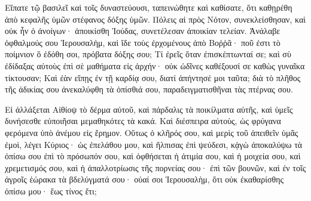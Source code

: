 {\par }{\PP {}Εἴπατε τῷ βασιλεῖ καὶ τοῖς δυναστεύουσι, ταπεινώθητε καὶ καθίσατε, ὅτι καθῃρέθη ἀπὸ κεφαλῆς ὑμῶν στέφανος δόξης ὑμῶν.
Πόλεις αἱ πρὸς Νότον, συνεκλείσθησαν, καὶ οὐκ ἦν ὁ ἀνοίγων· ἀποικίσθη Ἰούδας, συνετέλεσαν ἀποικίαν τελείαν.
Ἀνάλαβε ὀφθαλμούς σου Ἱερουσαλὴμ, καὶ ἴδε τοὺς ἐρχομένους ἀπὸ Βοῤῥᾶ· ποῦ ἐστι τὸ ποίμνιον ὃ ἐδόθη σοι, πρόβατα δόξης σου;
Τί ἐρεῖς ὅταν ἐπισκέπτωνταί σε; καὶ σὺ ἐδίδαξας αὐτοὺς ἐπὶ σὲ μαθήματα εἰς ἀρχήν· οὐκ ὠδῖνες καθέξουσί σε καθὼς γυναῖκα τίκτουσαν;
Καὶ ἐὰν εἴπῃς ἐν τῇ καρδίᾳ σου, διατί ἀπήντησέ μοι ταῦτα; διὰ τὸ πλῆθος τῆς ἀδικίας σου ἀνεκαλύφθη τὰ ὀπίσθιά σου, παραδειγματισθῆναι τὰς πτέρνας σου.
\par }{\PP {}Εἰ ἀλλάξεται Αἰθίοψ τὸ δέρμα αὐτοῦ, καὶ πάρδαλις τὰ ποικίλματα αὐτῆς, καὶ ὑμεῖς δυνήσεσθε εὐποιῆσαι μεμαθηκότες τὰ κακά.
Καὶ διέσπειρα αὐτοὺς, ὡς φρύγανα φερόμενα ὑπὸ ἀνέμου εἰς ἔρημον.
Οὕτως ὁ κλῆρός σου, καὶ μερὶς τοῦ ἀπειθεῖν ὑμᾶς ἐμοὶ, λέγει Κύριος· ὡς ἐπελάθου μου, καὶ ἤλπισας ἐπὶ ψεύδεσι,
κᾀγὼ ἀποκαλύψω τὰ ὀπίσω σου ἐπὶ τὸ πρόσωπόν σου, καὶ ὀφθήσεται ἡ ἀτιμία σου,
καὶ ἡ μοιχεία σου, καὶ χρεμετισμός σου, καὶ ἡ ἀπαλλοτρίωσις τῆς πορνείας σου· ἐπὶ τῶν βουνῶν, καὶ ἐν τοῖς ἀγροῖς ἑώρακα τὰ βδελύγματά σου· οὐαί σοι Ἱερουσαλὴμ, ὅτι οὐκ ἐκαθαρίσθης ὀπίσω μου· ἕως τίνος ἔτι;

}
